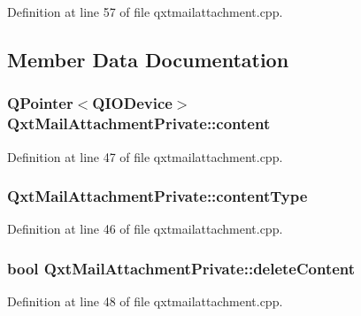 Definition at line 57 of file qxtmailattachment.\-cpp.



\subsection{Member Data Documentation}
\hypertarget{struct_qxt_mail_attachment_private_a9466a4671c5998d80beb2b101f5aab1b}{
\subsubsection[{content}]{\setlength{\rightskip}{0pt plus 5cm}Q\-Pointer$<$Q\-I\-O\-Device$>$ Qxt\-Mail\-Attachment\-Private\-::content}}\label{struct_qxt_mail_attachment_private_a9466a4671c5998d80beb2b101f5aab1b}


Definition at line 47 of file qxtmailattachment.\-cpp.

\hypertarget{struct_qxt_mail_attachment_private_a3a5899f0d5e13077c2cec7945f60f3e2}{
\subsubsection[{content\-Type}]{ Qxt\-Mail\-Attachment\-Private\-::content\-Type}}\label{struct_qxt_mail_attachment_private_a3a5899f0d5e13077c2cec7945f60f3e2}


Definition at line 46 of file qxtmailattachment.\-cpp.

\hypertarget{struct_qxt_mail_attachment_private_ac02c6d5f9385b472ae9065a028cfbdb3}{
\subsubsection[{delete\-Content}]{\setlength{\rightskip}{0pt plus 5cm}bool Qxt\-Mail\-Attachment\-Private\-::delete\-Content}}\label{struct_qxt_mail_attachment_private_ac02c6d5f9385b472ae9065a028cfbdb3}


Definition at line 48 of file qxtmailattachment.\-cpp.

